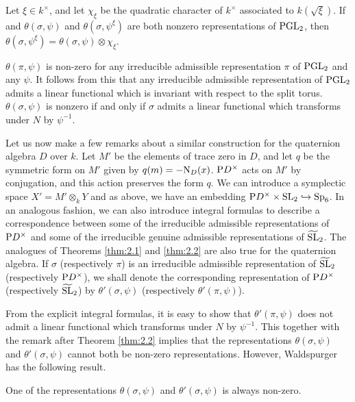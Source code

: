 \begin{theorem}
\label{thm:2.2}
Let $\xi \in k^\times$, and let $\chi_\xi$ be the quadratic character of $k^\times$ associated to $k(\sqrt{\xi})$.
If and $\theta(\sigma, \psi)$ and $\theta(\sigma, \psi^\xi)$ are both nonzero representations of $\mathrm{PGL}_2$, then $\theta(\sigma, \psi^\xi) = \theta(\sigma, \psi) \otimes \chi_\xi$.
\end{theorem}
\begin{remark*}
$\theta(\pi, \psi)$ is non-zero for any irreducible admissible representation $\pi$ of $\mathrm{PGL}_2$ and any $\psi$.
It follows from this that any irreducible admissible representation of $\mathrm{PGL}_2$ admits a linear functional which is invariant with respect to the split torus.
$\theta(\sigma, \psi)$ is nonzero if and only if $\sigma$ admits a linear functional which transforms under $N$ by $\psi^{-1}$.
\end{remark*}

Let us now make a few remarks about a similar construction for the quaternion algebra $D$ over $k$.
Let $M'$ be the elements of trace zero in $D$, and let $q$ be the symmetric form on $M'$ given by $q(m) = -\mathrm{N}_D(x)$.
$\mathrm{P} D^\times$ acts on $M'$ by conjugation, and this action preserves the form $q$.
We can introduce a symplectic space $X' = M'\otimes_k Y$ and as above, we have an embedding $\mathrm{P} D^\times \times \mathrm{SL}_2 \hookrightarrow \mathrm{Sp}_6$.
In an analogous fashion, we can also introduce integral formulas to describe a correspondence between some of the irreducible admissible representations of $\mathrm{P} D^\times$ and some of the irreducible genuine admissible representations of $\widetilde{\mathrm{SL}}_2$.
The analogues of Theorems \ref{thm:2.1} and \ref{thm:2.2} are also true for the quaternion algebra.
If $\sigma$ (respectively $\pi$) is an irreducible admissible representation of $\widetilde{\mathrm{SL}}_2$ (respectively $\mathrm{P} D^\times$), we shall denote the corresponding representation of $\mathrm{P} D^\times$ (respectively $\widetilde{\mathrm{SL}}_2$) by $\theta'(\sigma, \psi)$ (respectively $\theta'(\pi,\psi)$).

From the explicit integral formulas, it is easy to show that
$\theta'(\pi, \psi)$ does not admit a linear functional which transforms under $N$ by $\psi^{-1}$.
This together with the remark after Theorem \ref{thm:2.2} implies that the representations $\theta(\sigma, \psi)$ and $\theta'(\sigma, \psi)$ cannot both be non-zero representations.
However, Waldspurger has the following result.
\begin{theorem}
\label{thm:2.3}
One of the representations $\theta(\sigma, \psi)$ and $\theta'(\sigma, \psi)$ is always non-zero.
\end{theorem}

